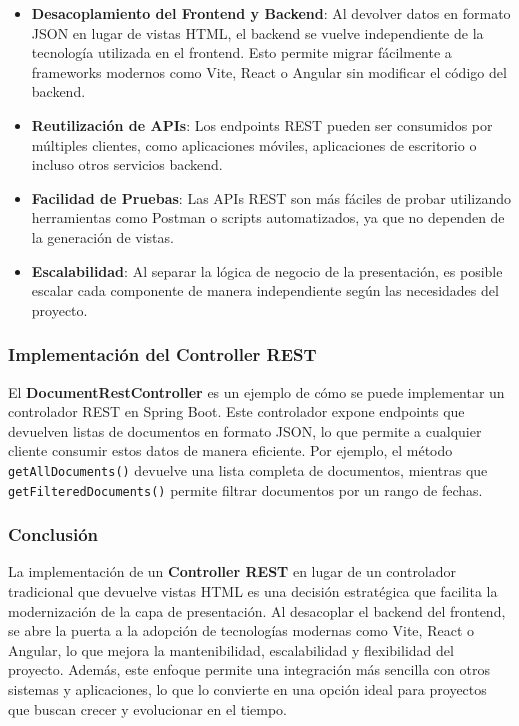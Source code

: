 \documentclass[draft]{scrbook}
\begin{document}
\begin{itemize}
    \item \textbf{Desacoplamiento del Frontend y Backend}: Al devolver datos en formato JSON en lugar de vistas HTML, el backend se vuelve independiente de la tecnología utilizada en el frontend. Esto permite migrar fácilmente a frameworks modernos como Vite, React o Angular sin modificar el código del backend.
    
    \item \textbf{Reutilización de APIs}: Los endpoints REST pueden ser consumidos por múltiples clientes, como aplicaciones móviles, aplicaciones de escritorio o incluso otros servicios backend.
    
    \item \textbf{Facilidad de Pruebas}: Las APIs REST son más fáciles de probar utilizando herramientas como Postman o scripts automatizados, ya que no dependen de la generación de vistas.
    
    \item \textbf{Escalabilidad}: Al separar la lógica de negocio de la presentación, es posible escalar cada componente de manera independiente según las necesidades del proyecto.
\end{itemize}

\subsubsection{Implementación del Controller REST}

El \textbf{DocumentRestController} es un ejemplo de cómo se puede implementar un controlador REST en Spring Boot. Este controlador expone endpoints que devuelven listas de documentos en formato JSON, lo que permite a cualquier cliente consumir estos datos de manera eficiente. Por ejemplo, el método \texttt{getAllDocuments()} devuelve una lista completa de documentos, mientras que \texttt{getFilteredDocuments()} permite filtrar documentos por un rango de fechas.

\subsubsection{Conclusión}

La implementación de un \textbf{Controller REST} en lugar de un controlador tradicional que devuelve vistas HTML es una decisión estratégica que facilita la modernización de la capa de presentación. Al desacoplar el backend del frontend, se abre la puerta a la adopción de tecnologías modernas como Vite, React o Angular, lo que mejora la mantenibilidad, escalabilidad y flexibilidad del proyecto. Además, este enfoque permite una integración más sencilla con otros sistemas y aplicaciones, lo que lo convierte en una opción ideal para proyectos que buscan crecer y evolucionar en el tiempo.
\end{document}
